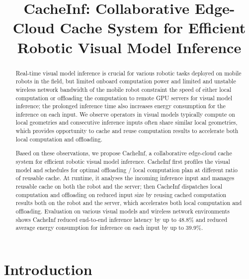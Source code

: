 \documentclass[nonacm,sigplan]{acmart}
\begin{document}
\title{CacheInf: Collaborative Edge-Cloud Cache System for Efficient Robotic Visual Model Inference}


\begin{abstract}
  Real-time visual model inference is crucial for various robotic tasks deployed on mobile robots in the field, but limited onboard computation power and limited and unstable wireless network bandwidth of the mobile robot constraint the speed of either local computation or offloading the computation to remote GPU servers for visual model inference; the prolonged inference time also increases energy consumption for the inference on each input.
  We observe operators in visual models typically compute on local geometries and consecutive inference inputs often share similar local geometries, which provides opportunity to cache and reuse computation results to accelerate both local computation and offloading.

  Based on these observations, we propose CacheInf, a collaborative edge-cloud cache system for efficient robotic visual model inference.
  CacheInf first profiles the visual model and schedules for optimal offloading / local computation plan at different ratio of reusable cache.
  At runtime, it analyses the incoming inference input and manages reusable cache on both the robot and the server; then CacheInf dispatches local computation and offloading on reduced input size by reusing cached computation results both on the robot and the server, which accelerates both local computation and offloading.
  Evaluation on various visual models and wireless network environments shows CacheInf reduced end-to-end inference latency by up to 48.8\% and reduced average energy consumption for inference on each input by up to 39.9\%.

\end{abstract}

\maketitle %
\pagestyle{plain} %


\section{Introduction}

\end{document}
